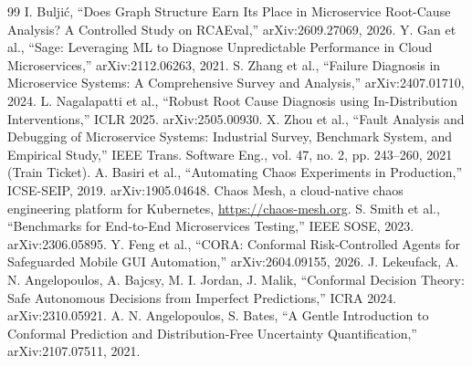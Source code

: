 \begin{thebibliography}{99}
 I. Bulji\'{c}, ``Does Graph Structure Earn Its Place in Microservice Root-Cause Analysis? A Controlled Study on RCAEval,'' arXiv:2609.27069, 2026.
 Y. Gan et al., ``Sage: Leveraging ML to Diagnose Unpredictable Performance in Cloud Microservices,'' arXiv:2112.06263, 2021.
 S. Zhang et al., ``Failure Diagnosis in Microservice Systems: A Comprehensive Survey and Analysis,'' arXiv:2407.01710, 2024.
 L. Nagalapatti et al., ``Robust Root Cause Diagnosis using In-Distribution Interventions,'' ICLR 2025. arXiv:2505.00930.
 X. Zhou et al., ``Fault Analysis and Debugging of Microservice Systems: Industrial Survey, Benchmark System, and Empirical Study,'' IEEE Trans. Software Eng., vol. 47, no. 2, pp. 243--260, 2021 (Train Ticket).
 A. Basiri et al., ``Automating Chaos Experiments in Production,'' ICSE-SEIP, 2019. arXiv:1905.04648.
 Chaos Mesh, a cloud-native chaos engineering platform for Kubernetes, \url{https://chaos-mesh.org}.
 S. Smith et al., ``Benchmarks for End-to-End Microservices Testing,'' IEEE SOSE, 2023. arXiv:2306.05895.
 Y. Feng et al., ``CORA: Conformal Risk-Controlled Agents for Safeguarded Mobile GUI Automation,'' arXiv:2604.09155, 2026.
 J. Lekeufack, A. N. Angelopoulos, A. Bajcsy, M. I. Jordan, J. Malik, ``Conformal Decision Theory: Safe Autonomous Decisions from Imperfect Predictions,'' ICRA 2024. arXiv:2310.05921.
 A. N. Angelopoulos, S. Bates, ``A Gentle Introduction to Conformal Prediction and Distribution-Free Uncertainty Quantification,'' arXiv:2107.07511, 2021.
\end{thebibliography}


